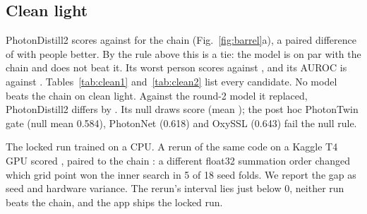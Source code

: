 \documentclass[11pt,letterpaper]{article}
\begin{document}
\subsection{Clean light}
PhotonDistill2 scores \WinLzero{} \WinLzeroCI{} against \ChainLzero{} \ChainLzeroCI{} for the chain (Fig.~\ref{fig:barrel}a), a paired difference of \WinLzeroDiff{} \WinLzeroDiffCI{} with \WinLzeroBetter{} people better. By the rule above this is a tie: the model is on par with the chain and does not beat it. Its worst person scores \WinLzeroWorst{} against \ChainLzeroWorst{}, and its AUROC is \WinLzeroAuroc{} against \ChainLzeroAuroc{}. Tables~\ref{tab:clean1} and~\ref{tab:clean2} list every candidate. No model beats the chain on clean light. Against the round-2 model it replaced, PhotonDistill2 differs by \WinVsDistillLzero{} \WinVsDistillLzeroCI{}. Its null draws score \WinNullList{} (mean \WinNullMean{}); the post hoc PhotonTwin gate (null mean 0.584), PhotonNet (0.618) and OxySSL (0.643) fail the null rule.

The locked run trained on a CPU. A rerun of the same code on a Kaggle T4 GPU scored \DistillTwoGpuLzero{} \DistillTwoGpuLzeroCI{}, paired to the chain \DistillTwoGpuLzeroDiff{} \DistillTwoGpuLzeroDiffCI{}: a different float32 summation order changed which grid point won the inner search in 5 of 18 seed folds. We report the gap as seed and hardware variance. The rerun's interval lies just below 0, neither run beats the chain, and the app ships the locked run.
\end{document}
